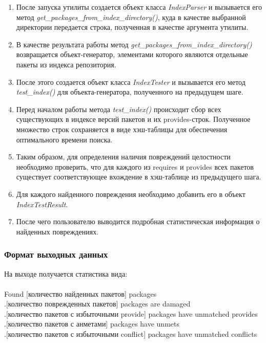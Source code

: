 \begin{enumerate}
\item
После запуска утилиты создается объект класса \textit{IndexParser} и вызывается его метод
\textit{get\_packages\_from\_index\_directory()}, куда в качестве выбранной
директории передается строка, полученная в качестве аргумента утилиты.

\item
В качестве результата работы метод \textit{get\_packages\_from\_index\_directory()}
возвращается объект-генератор, элементами которого являются отдельные пакеты из индекса 
репозитория.

\item
После этого создается объект класса \textit{IndexTester} и вызывается его метод
\textit{test\_index()} для объекта-генератора, полученного на предыдущем шаге.

\item
Перед началом работы метода \textit{test\_index()} происходит сбор всех существующих
в индексе версий пакетов и их provides-строк. Полученное множество строк сохраняется
в виде хэш-таблицы для обеспечения оптимального времени поиска.

\item
Таким образом, для определения наличия повреждений целостности
необходимо проверить, что для каждого из requires и provides всех пакетов
существует соответствующее вхождение в хэш-таблице из предыдущего шага.

\item 
Для каждого найденного повреждения необходимо добавить его в объект \textit{IndexTestResult}.

\item
После чего пользователю выводится подробная статистическая информация о найденных повреждениях.

\end{enumerate}

\subsubsection{Формат выходных данных}

На выходе получается статистика вида:\\
\\
Found [количество найденных пакетов] packages\\
.[количество поврежденных пакетов] packages are damaged\\
.[количество пакетов с избыточными provide] packages have unmatched provides\\
.[количество пакетов с анметами] packages have unmets\\
.[количество пакетов с избыточными conflict] packages have unmatched conflicts\\

